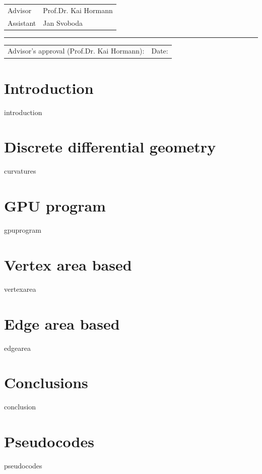 \documentclass[12pt]{article}
\theoremstyle{definition}
\theoremstyle{definition}
\theoremstyle{plain}
\theoremstyle{plain}
\theoremstyle{plain}
\theoremstyle{plain}
\theoremstyle{definition}
\theoremstyle{remark}
\theoremstyle{remark}
\theoremstyle{remark}
\theoremstyle{remark}
\newcommand{\ADVISOR}{Prof.Dr. Kai Hormann}
\newcommand{\ASSISTANT}{Jan Svoboda}
\begin{document}
\begin{small}
  \begin{tabular}{@{}ll@{}}
    Advisor   & \ADVISOR   \\
    Assistant & \ASSISTANT
  \end{tabular}
\end{small}

\vspace{-.1cm}\rule{\textwidth}{0.4pt}

\begin{small}
  \begin{tabular}{@{} p{} l @{}}
    Advisor's approval (\ADVISOR): & Date:
  \end{tabular}
\end{small}



\newpage \tableofcontents

\newpage \section{Introduction}
{introduction}

\section{Discrete differential geometry}
{curvatures}

\section{GPU program}
{gpuprogram}

\section{Vertex area based}
{vertexarea}

\section{Edge area based}
{edgearea}

\section{Conclusions}
{conclusion}

\newpage




\appendix
\newpage \section{Pseudocodes}
{pseudocodes}


\end{document}
